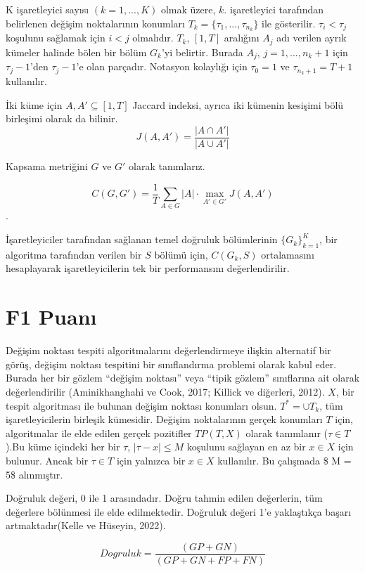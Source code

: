 \documentclass[12pt,twoside]{deuthesis}
\begin{document}
K işaretleyici sayısı \((k=1,...,K)\) olmak üzere, \(k.\) işaretleyici tarafından belirlenen değişim noktalarının konumları \(T_k = \{\tau_1,...,\tau_{n_k}\}\) ile gösterilir. \(\tau_i < \tau_j\) koşulunu sağlamak için \(i < j\) olmalıdır. \(T_k\), \([1, T]\) aralığını \(A_j\) adı verilen ayrık kümeler halinde bölen bir bölüm \(G_k\)'yi belirtir. Burada \(A_j\), \(j = 1,...,n_k +1\) için \(\tau_{j} -1\)'den \(\tau_{j} -1\)'e olan parçadır. Notasyon kolaylığı için \(\tau_0 = 1\) ve \(\tau_{n_k+1} = T +1\) kullanılır.

İki küme için \(A, A' \subseteq [1, T ]\) Jaccard indeksi, ayrıca iki kümenin kesişimi bölü birleşimi olarak da bilinir. \[J(A,A')=\frac{|A\cap A'|}{|A\cup A'|}\]

Kapsama metriğini \(G\) ve \(G'\) olarak tanımlarız.

\[C(G,G') = \frac{1}{T} \sum_{A \in G} |A| \cdot \max_{A' \in G'} J(A,A')\].

İşaretleyiciler tarafından sağlanan temel doğruluk bölümlerinin \(\{G_k\}_{k=1}^K\), bir algoritma tarafından verilen bir \(S\) bölümü için, \(C(G_k,S)\) ortalamasını hesaplayarak işaretleyicilerin tek bir performansını değerlendirilir.

\section{F1 Puanı}\label{f1-puanux131}

Değişim noktası tespiti algoritmalarını değerlendirmeye ilişkin alternatif bir görüş, değişim noktası tespitini bir sınıflandırma problemi olarak kabul eder. Burada her bir gözlem ``değişim noktası'' veya ``tipik gözlem'' sınıflarına ait olarak değerlendirilir (Aminikhanghahi ve Cook, 2017; Killick ve diğerleri, 2012). \(X\), bir tespit algoritması ile bulunan değişim noktası konumları olsun. \(T^* = \cup T_k\), tüm işaretleyicilerin birleşik kümesidir. Değişim noktalarının gerçek konumları \(T\) için, algoritmalar ile elde edilen gerçek pozitifler \(TP(T, X)\) olarak tanımlanır (\(\tau \in T\)).Bu küme içindeki her bir \(\tau\), \(|\tau - x| \leq M\) koşulunu sağlayan en az bir \(x \in X\) için bulunur. Ancak bir \(\tau \in T\) için yalnızca bir \(x \in X\) kullanılır. Bu çalışmada \$ M = 5\$ alınmıştır.

Doğruluk değeri, 0 ile 1 arasındadır. Doğru tahmin edilen değerlerin, tüm değerlere bölünmesi ile elde edilmektedir. Doğruluk değeri 1'e yaklaştıkça başarı artmaktadır(Kelle ve Hüseyin, 2022).

\[Dogruluk = \frac{(GP + GN)}{(GP + GN + FP + FN)}\]
\end{document}

